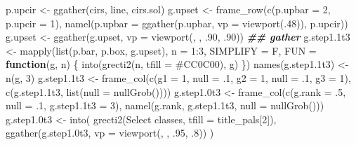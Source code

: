 \documentclass[
]{article}
\newenvironment{Shaded}{\begin{snugshade}}{\end{snugshade}}
\newcommand{\AttributeTok}[1]{\textcolor[rgb]{0.77,0.63,0.00}{#1}}
\newcommand{\ControlFlowTok}[1]{\textcolor[rgb]{0.13,0.29,0.53}{\textbf{#1}}}
\newcommand{\DecValTok}[1]{\textcolor[rgb]{0.00,0.00,0.81}{#1}}
\newcommand{\DocumentationTok}[1]{\textcolor[rgb]{0.56,0.35,0.01}{\textbf{\textit{#1}}}}
\newcommand{\FloatTok}[1]{\textcolor[rgb]{0.00,0.00,0.81}{#1}}
\newcommand{\FunctionTok}[1]{\textcolor[rgb]{0.00,0.00,0.00}{#1}}
\newcommand{\NormalTok}[1]{#1}
\newcommand{\OtherTok}[1]{\textcolor[rgb]{0.56,0.35,0.01}{#1}}
\newcommand{\SpecialCharTok}[1]{\textcolor[rgb]{0.00,0.00,0.00}{#1}}
\newcommand{\StringTok}[1]{\textcolor[rgb]{0.31,0.60,0.02}{#1}}
\begin{document}
\begin{Shaded}
\begin{Highlighting}[]
\NormalTok{p.upcir }\OtherTok{\textless{}{-}} \FunctionTok{ggather}\NormalTok{(cirs, line, cirs.sol)}
\NormalTok{g.upset }\OtherTok{\textless{}{-}} \FunctionTok{frame\_row}\NormalTok{(}\FunctionTok{c}\NormalTok{(}\AttributeTok{p.upbar =} \DecValTok{2}\NormalTok{, }\AttributeTok{p.upcir =} \DecValTok{1}\NormalTok{),}
  \FunctionTok{namel}\NormalTok{(}\AttributeTok{p.upbar =} \FunctionTok{ggather}\NormalTok{(p.upbar, }\AttributeTok{vp =} \FunctionTok{viewport}\NormalTok{(.}\DecValTok{48}\NormalTok{)), p.upcir))}
\NormalTok{g.upset }\OtherTok{\textless{}{-}} \FunctionTok{ggather}\NormalTok{(g.upset, }\AttributeTok{vp =} \FunctionTok{viewport}\NormalTok{(, , .}\DecValTok{90}\NormalTok{, .}\DecValTok{90}\NormalTok{))}
\DocumentationTok{\#\# gather}
\NormalTok{g.step1}\FloatTok{.1}\NormalTok{t3 }\OtherTok{\textless{}{-}} \FunctionTok{mapply}\NormalTok{(}\FunctionTok{list}\NormalTok{(p.bar, p.box, g.upset), }\AttributeTok{n =} \DecValTok{1}\SpecialCharTok{:}\DecValTok{3}\NormalTok{, }\AttributeTok{SIMPLIFY =}\NormalTok{ F,}
  \AttributeTok{FUN =} \ControlFlowTok{function}\NormalTok{(g, n) \{}
    \FunctionTok{into}\NormalTok{(}\FunctionTok{grecti2}\NormalTok{(n, }\AttributeTok{tfill =} \StringTok{\textquotesingle{}\#CC0C00\textquotesingle{}}\NormalTok{), g)}
\NormalTok{  \})}
\FunctionTok{names}\NormalTok{(g.step1}\FloatTok{.1}\NormalTok{t3) }\OtherTok{\textless{}{-}} \FunctionTok{n}\NormalTok{(g, }\DecValTok{3}\NormalTok{)}
\NormalTok{g.step1}\FloatTok{.1}\NormalTok{t3 }\OtherTok{\textless{}{-}} \FunctionTok{frame\_col}\NormalTok{(}\FunctionTok{c}\NormalTok{(}\AttributeTok{g1 =} \DecValTok{1}\NormalTok{, }\AttributeTok{null =}\NormalTok{ .}\DecValTok{1}\NormalTok{, }\AttributeTok{g2 =} \DecValTok{1}\NormalTok{, }\AttributeTok{null =}\NormalTok{ .}\DecValTok{1}\NormalTok{, }\AttributeTok{g3 =} \DecValTok{1}\NormalTok{),}
  \FunctionTok{c}\NormalTok{(g.step1}\FloatTok{.1}\NormalTok{t3, }\FunctionTok{list}\NormalTok{(}\AttributeTok{null =} \FunctionTok{nullGrob}\NormalTok{())))}
\NormalTok{g.step1}\FloatTok{.0}\NormalTok{t3 }\OtherTok{\textless{}{-}} \FunctionTok{frame\_col}\NormalTok{(}\FunctionTok{c}\NormalTok{(}\AttributeTok{g.rank =}\NormalTok{ .}\DecValTok{5}\NormalTok{, }\AttributeTok{null =}\NormalTok{ .}\DecValTok{1}\NormalTok{, }\AttributeTok{g.step1.1t3 =} \DecValTok{3}\NormalTok{),}
  \FunctionTok{namel}\NormalTok{(g.rank, g.step1}\FloatTok{.1}\NormalTok{t3, }\AttributeTok{null =} \FunctionTok{nullGrob}\NormalTok{()))}
\NormalTok{g.step1}\FloatTok{.0}\NormalTok{t3 }\OtherTok{\textless{}{-}} \FunctionTok{into}\NormalTok{(}
  \FunctionTok{grecti2}\NormalTok{(}\StringTok{\textquotesingle{}Select classes\textquotesingle{}}\NormalTok{, }\AttributeTok{tfill =}\NormalTok{ title\_pals[}\DecValTok{2}\NormalTok{]), }
  \FunctionTok{ggather}\NormalTok{(g.step1}\FloatTok{.0}\NormalTok{t3, }\AttributeTok{vp =} \FunctionTok{viewport}\NormalTok{(, , .}\DecValTok{95}\NormalTok{, .}\DecValTok{8}\NormalTok{))}
\NormalTok{)}


\end{Highlighting}
\end{Shaded}
\end{document}
